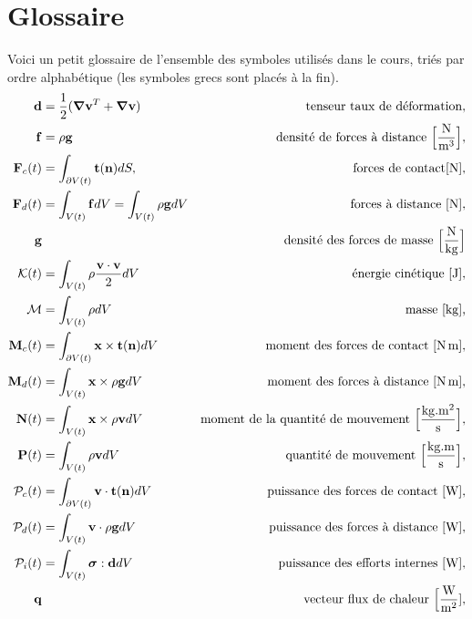 \chapter{Glossaire}
  Voici un petit glossaire de l'ensemble des symboles utilisés dans le cours, triés par ordre alphabétique (les symboles grecs sont placés à la fin).
  \begingroup
  \allowdisplaybreaks
  \begin{align*}
    \vb{d} &= \frac{1}{2}(\grad\vb{v}^T + \grad\vb{v}) & \textrm{tenseur taux de déformation},\\
    \vb{f} &= \rho \vb{g} & \textrm{densité de forces à distance } \Big[\si{\frac{N}{m^3}}\Big], \\
    \mathcal{\vb{F}}_c (t) &= \int_{\partial V(t)} \vb{t}(\vb{n}) dS, & \textrm{forces de contact} [\si{N}],\\
    \mathcal{\vb{F}}_d (t) &= \int_{V(t)} \vb{f} dV = \int_{V(t)} \rho \vb{g} dV & \textrm{forces à distance } [\si{N}],\\
    \vb{g} & & \textrm {densité des forces de masse } \Big[\si{\frac{N}{kg}}\Big]\\
    \mathcal{K}(t) &= \int_{V(t)} \rho \frac{\vb{v}\cdot\vb{v}}{2} dV & \textrm{énergie cinétique } [\si{J}],\\
    \mathcal{M} & = \int_{V(t)} \rho dV  & \textrm{masse [\si{kg}],}\\
    \mathcal{\vb{M}}_c (t) &= \int_{\partial V(t)} \vb{x} \times \vb{t}(\vb{n}) dV & \textrm{moment des forces de contact } [\si{N.m}],\\
    \mathcal{\vb{M}}_d (t) &= \int_{V(t)} \vb{x} \times \rho \vb{g} dV & \textrm{moment des forces à distance } [\si{N.m}],\\
    \mathcal{\vb{N}}(t) &= \int_{V(t)} \vb{x} \times \rho \vb{v} dV & \textrm{moment de la quantité de mouvement } \Big[\si{\frac{kg.m^2}{s}}\Big],\\
    \mathcal{\vb{P}}(t) &= \int_{V(t)} \rho \vb{v} dV & \textrm{quantité de mouvement } \Big[\si{\frac{kg.m}{s}}\Big],\\
    \mathcal{P}_c(t) &= \int_{\partial V(t)} \vb{v} \cdot \vb{t}(\vb{n}) dV & \textrm{puissance des forces de contact } [\si{W}], \\
    \mathcal{P}_d(t) &= \int_{V(t)} \vb{v} \cdot \rho \vb{g} dV & \textrm{puissance des forces à distance } [\si{W}], \\
    \mathcal{P}_i(t) &= \int_{V(t)} \boldsymbol{\sigma} : \vb{d} dV & \textrm{puissance des efforts internes } [\si{W}],\\
    \vb{q} & & \textrm{vecteur flux de chaleur } \Big[\si{\frac{W}{m^2}}], \\

\end{align*}
